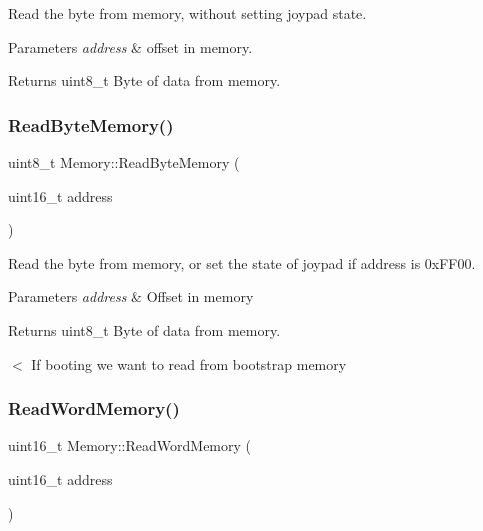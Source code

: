 Read the byte from memory, without setting joypad state. 


\begin{DoxyParams}{Parameters}
{\em address} & offset in memory. \\
\hline
\end{DoxyParams}
\begin{DoxyReturn}{Returns}
uint8\+\_\+t Byte of data from memory. 
\end{DoxyReturn}
\mbox{\label{classMemory_a2f04d90cf6d05ab12b52c1d6aef862a4}} 
\subsubsection{\texorpdfstring{Read\+Byte\+Memory()}{ReadByteMemory()}}
{\footnotesize\ttfamily uint8\+\_\+t Memory\+::\+Read\+Byte\+Memory (\begin{DoxyParamCaption}\item[{uint16\+\_\+t}]{address }\end{DoxyParamCaption})}



Read the byte from memory, or set the state of joypad if address is 0x\+F\+F00. 


\begin{DoxyParams}{Parameters}
{\em address} & Offset in memory \\
\hline
\end{DoxyParams}
\begin{DoxyReturn}{Returns}
uint8\+\_\+t Byte of data from memory. 
\end{DoxyReturn}
$<$ If booting we want to read from bootstrap memory \mbox{\label{classMemory_ad314fa06068d46d02aabd53277c24b48}} 
\subsubsection{\texorpdfstring{Read\+Word\+Memory()}{ReadWordMemory()}}
{\footnotesize\ttfamily uint16\+\_\+t Memory\+::\+Read\+Word\+Memory (\begin{DoxyParamCaption}\item[{uint16\+\_\+t}]{address }\end{DoxyParamCaption})}



